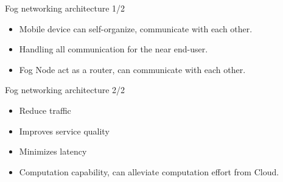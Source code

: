 \documentclass{beamer}
\begin{document}
\begin{frame}{Fog networking architecture 1/2}
    \begin{itemize}
        \item {Mobile device can self-organize, communicate with each other.}
        \item {Handling all communication for the near end-user.}
        \item {Fog Node act as a router, can communicate with each other.}
    \end{itemize}
\end{frame}
\begin{frame}{Fog networking architecture 2/2}
    \begin{itemize}
        \item {Reduce traffic}
        \item {Improves service quality}
        \item {Minimizes latency}
        \item {Computation capability, can alleviate computation effort from Cloud.}
    \end{itemize}
\end{frame}
\end{document}
